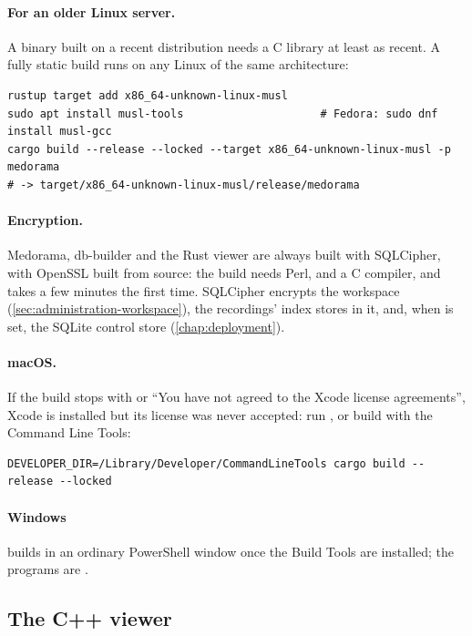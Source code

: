 \paragraph{For an older Linux server.} A binary built on a recent distribution needs a C library
at least as recent. A fully static build runs on any Linux of the same architecture:
\begin{lstlisting}[style=shell]
rustup target add x86_64-unknown-linux-musl
sudo apt install musl-tools                     # Fedora: sudo dnf install musl-gcc
cargo build --release --locked --target x86_64-unknown-linux-musl -p medorama
# -> target/x86_64-unknown-linux-musl/release/medorama
\end{lstlisting}

\paragraph{Encryption.} Medorama, db-builder and the Rust viewer are always built with SQLCipher,
with OpenSSL built from source: the build needs Perl,  and a C compiler, and takes a few
minutes the first time. SQLCipher encrypts the workspace (\cref{sec:administration-workspace}),
the recordings' index stores in it, and, when  is set, the SQLite control store
(\cref{chap:deployment}).

\paragraph{macOS.} If the build stops with  or
``You have not agreed to the Xcode license agreements'', Xcode is installed but its license was
never accepted: run , or build with the Command Line Tools:
\begin{lstlisting}[style=shell]
DEVELOPER_DIR=/Library/Developer/CommandLineTools cargo build --release --locked
\end{lstlisting}

\paragraph{Windows} builds in an ordinary PowerShell window once the Build Tools are installed;
the programs are .

\subsection{The C++ viewer}
\label{sec:installation-cpp}

